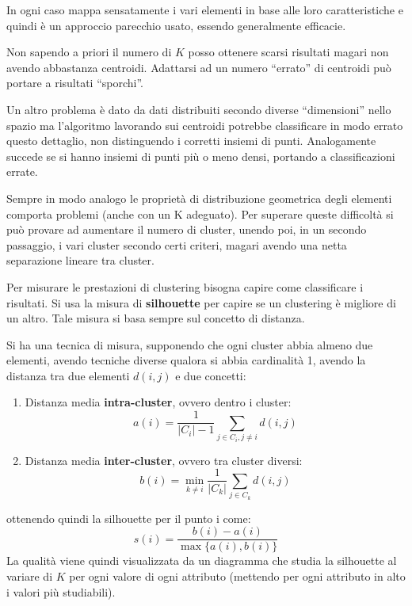 In ogni caso mappa sensatamente i vari elementi in base alle loro caratteristiche e quindi è un approccio parecchio usato, essendo generalmente efficacie.

Non sapendo a priori il numero di $K$ posso ottenere scarsi risultati magari non avendo abbastanza centroidi. Adattarsi ad un numero “errato” di centroidi può portare a risultati “sporchi”.

Un altro problema è dato da dati distribuiti secondo diverse “dimensioni” nello spazio ma l'algoritmo lavorando sui centroidi potrebbe classificare in modo errato questo dettaglio, non distinguendo i corretti insiemi di punti. Analogamente succede se si hanno insiemi di punti più o meno densi, portando a classificazioni errate.

Sempre in modo analogo le proprietà di distribuzione geometrica degli elementi comporta problemi (anche con un K adeguato). Per superare queste difficoltà si può provare ad aumentare il numero di cluster, unendo poi, in un secondo passaggio, i vari cluster secondo certi criteri, magari avendo una netta separazione lineare tra cluster.

Per misurare le prestazioni di clustering bisogna capire come classificare i risultati. Si usa la misura di \textbf{silhouette} per capire se un clustering è migliore di un altro. Tale misura si basa sempre sul concetto di distanza.

Si ha una tecnica di misura, supponendo che ogni cluster abbia almeno due elementi, avendo tecniche diverse qualora si abbia cardinalità 1, avendo la distanza tra due elementi $d(i, j)$ e due concetti:
\begin{enumerate}
    \item Distanza media \textbf{intra-cluster}, ovvero dentro i cluster:
    \begin{equation}
        a(i) = \frac{1}{|C_i| - 1} \sum_{j \in C_i, j \neq i} d(i, j)
    \end{equation}
    \item Distanza media \textbf{inter-cluster}, ovvero tra cluster diversi:
    \begin{equation}
        b(i) = \min_{k \neq i} \frac{1}{|C_k|} \sum_{j \in C_k} d(i, j)
    \end{equation}
\end{enumerate}
ottenendo quindi la silhouette per il punto i come:
\begin{equation}
    s(i) = \frac{b(i) - a(i)}{\max\{a(i), b(i)\}}
\end{equation}
La qualità viene quindi visualizzata da un diagramma che studia la silhouette al variare di $K$ per ogni valore di ogni attributo (mettendo per ogni attributo in alto i valori più studiabili).

